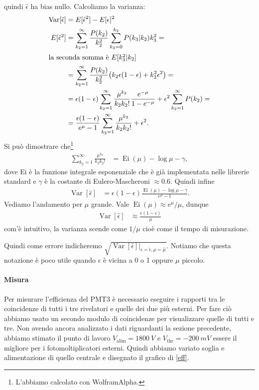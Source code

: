 \documentclass[a4paper]{article}
\begin{document}
quindi $\hat\epsilon$ ha bias nullo.
Calcoliamo la varianza:
\begin{align*}
	\operatorname{Var}[\hat\epsilon]
	&= E[\hat\epsilon^2] - E[\epsilon]^2 \\
	E[\hat\epsilon^2]
	&= \sum_{k_2=1}^\infty \frac{P(k_2)}{k_2^2}
	\sum_{k_3=0}^{k_2} P(k_3|k_2) k_3^2 = \\
	\intertext{la seconda somma è $E[k_3^2|k_2]$}
	&= \sum_{k_2=1}^\infty \frac{P(k_2)}{k_2^2}
	\big (k_2\epsilon(1-\epsilon) + k_2^2\epsilon^2 \big) = \\
	&= \epsilon(1-\epsilon) \sum_{k_2=1}^\infty \frac{\mu^{k_2}}{k_2k_2!}\frac{e^{-\mu}}{1-e^{-\mu}}
	+ \epsilon^2 \sum_{k_2=1}^\infty P(k_2) = \\
	&= \frac{\epsilon(1-\epsilon)}{e^{\mu}-1} \sum_{k_2=1}^\infty \frac{\mu^{k_2}}{k_2k_2!} + \epsilon^2.
\end{align*}
Si può dimostrare che\footnote{L'abbiamo calcolato con WolframAlpha.}
\begin{align*}
	\sum_{k_2=1}^\infty \frac{\mu^{k_2}}{k_2k_2!}
	&= \operatorname{Ei}(\mu) - \log\mu - \gamma,
\end{align*}
dove Ei è la funzione integrale esponenziale che è già implementata nelle librerie standard
e $\gamma$ è la costante di Eulero-Mascheroni $\approx 0.6$.
Quindi infine
\begin{align*}
	\operatorname{Var}[\hat\epsilon]
	&= \epsilon(1-\epsilon)\frac{\operatorname{Ei}(\mu) - \log\mu - \gamma}{e^\mu - 1}.
\end{align*}
Vediamo l'andamento per $\mu$ grande.
Vale $\operatorname{Ei}(\mu) \approx e^{\mu}/\mu$, dunque
\begin{align*}
	\operatorname{Var}[\hat\epsilon]
	&\approx \frac{\epsilon(1-\epsilon)}{\mu}
\end{align*}
com'è intuitivo, la varianza scende come $1/\mu$ cioè come il tempo di misurazione.

Quindi come errore indicheremo $\sqrt{\operatorname{Var}[\hat\epsilon]\big|_{\epsilon=\hat\epsilon,\mu=\hat\mu}}$.
Notiamo che questa notazione è poco utile quando $\epsilon$ è vicina a 0 o 1 oppure $\mu$ piccolo.

\paragraph{Misura}

Per misurare l'efficienza del PMT3 è necessario eseguire i rapporti tra le coincidenze di tutti i tre rivelatori e quelle dei due più esterni. Per fare ciò abbiamo usato un secondo modulo di coincidenze per visualizzare quelle di tutti e tre. Non avendo ancora analizzato i dati riguardanti la sezione precedente, abbiamo stimato il punto di lavoro $V_\text{alim}=\SI{1800}{V}$ e $V_{\text{thr}}=\SI{-200}{mV}$ essere il migliore per i fotomoltiplicatori esterni. Quindi abbiamo variato soglia e alimentazione di quello centrale e disegnato il grafico di \autoref{eff}.
\end{document}

